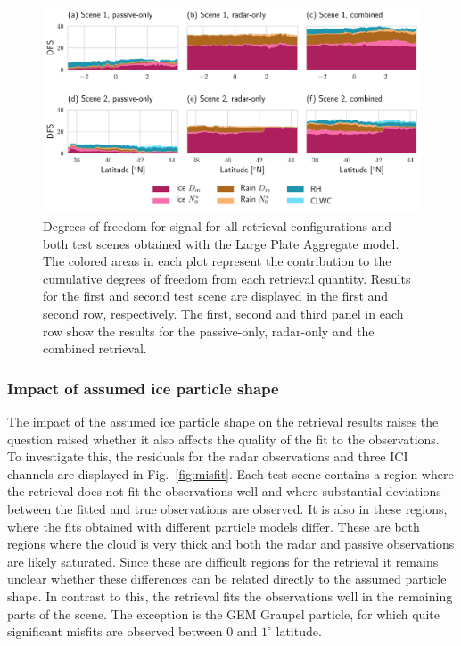 \documentclass[journal abbreviation, manuscript]{copernicus}
\begin{document}
\begin{figure}
\centering
\includegraphics[width = 1.0\textwidth]{../plots/dfs}
\caption{Degrees of freedom for signal for all retrieval configurations and both
  test scenes obtained with the Large Plate Aggregate model. The colored areas
  in each plot represent the contribution to the cumulative degrees of freedom
  from each retrieval quantity. Results for the first and second test scene
  are displayed in the first and second row, respectively. The first, second
  and third panel in each row show the results for the passive-only, radar-only
  and the combined retrieval.}
\label{fig:dfs}
\end{figure}

\subsubsection{Impact of assumed ice particle shape}

The impact of the assumed ice particle shape on the retrieval results raises the
question raised whether it also affects the quality of the fit to the
observations. To investigate this, the residuals for the radar observations and
three ICI channels are displayed in Fig.~\ref{fig:misfit}. Each test scene
contains a region where the retrieval does not fit the observations well and
where substantial deviations between the fitted and true observations are
observed. It is also in these regions, where the fits obtained with different
particle models differ. These are both regions where the cloud is very thick and
both the radar and passive observations are likely saturated. Since these are
difficult regions for the retrieval it remains unclear whether these differences
can be related directly to the assumed particle shape. In contrast to this, the
retrieval fits the observations well in the remaining parts of the scene. The
exception is the GEM Graupel particle, for which quite significant misfits are
observed between $0$ and $1^{\circ}$ latitude.
\end{document}
